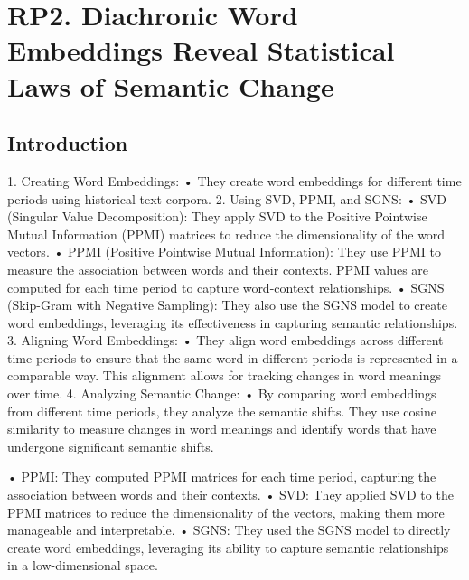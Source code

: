 
\section{RP2. Diachronic Word Embeddings Reveal Statistical Laws of Semantic Change} \label{sec:paper_hamilton}
\subsection{Introduction}\label{subsec:hamilton_introduction}





1.	Creating Word Embeddings:
•	They create word embeddings for different time periods using historical text corpora.
2.	Using SVD, PPMI, and SGNS:
•	SVD (Singular Value Decomposition): They apply SVD to the Positive Pointwise Mutual Information (PPMI) matrices to reduce the dimensionality of the word vectors.
•	PPMI (Positive Pointwise Mutual Information): They use PPMI to measure the association between words and their contexts. PPMI values are computed for each time period to capture word-context relationships.
•	SGNS (Skip-Gram with Negative Sampling): They also use the SGNS model to create word embeddings, leveraging its effectiveness in capturing semantic relationships.
3.	Aligning Word Embeddings:
•	They align word embeddings across different time periods to ensure that the same word in different periods is represented in a comparable way. This alignment allows for tracking changes in word meanings over time.
4.	Analyzing Semantic Change:
•	By comparing word embeddings from different time periods, they analyze the semantic shifts. They use cosine similarity to measure changes in word meanings and identify words that have undergone significant semantic shifts.

•	PPMI: They computed PPMI matrices for each time period, capturing the association between words and their contexts.
•	SVD: They applied SVD to the PPMI matrices to reduce the dimensionality of the vectors, making them more manageable and interpretable.
•	SGNS: They used the SGNS model to directly create word embeddings, leveraging its ability to capture semantic relationships in a low-dimensional space.

